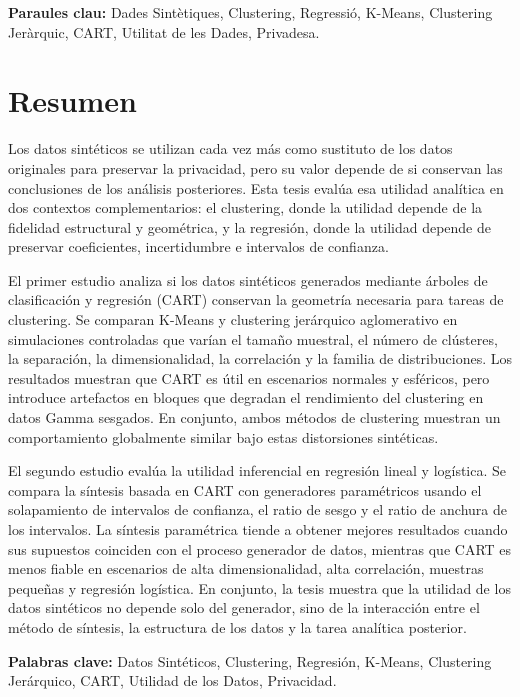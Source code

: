 \documentclass[12pt, a4paper, twoside]{report}
\begin{document}
\vspace{0.5cm}
\noindent\textbf{Paraules clau:} Dades Sint\`etiques, Clustering, Regressi\'o, K-Means, Clustering Jer\`arquic, CART, Utilitat de les Dades, Privadesa.

\newpage

\chapter*{Resumen}
Los datos sint\'eticos se utilizan cada vez m\'as como sustituto de los datos originales para preservar la privacidad, pero su valor depende de si conservan las conclusiones de los an\'alisis posteriores. Esta tesis eval\'ua esa utilidad anal\'itica en dos contextos complementarios: el clustering, donde la utilidad depende de la fidelidad estructural y geom\'etrica, y la regresi\'on, donde la utilidad depende de preservar coeficientes, incertidumbre e intervalos de confianza.

El primer estudio analiza si los datos sint\'eticos generados mediante \'arboles de clasificaci\'on y regresi\'on (CART) conservan la geometr\'ia necesaria para tareas de clustering. Se comparan K-Means y clustering jer\'arquico aglomerativo en simulaciones controladas que var\'ian el tama\~no muestral, el n\'umero de cl\'usteres, la separaci\'on, la dimensionalidad, la correlaci\'on y la familia de distribuciones. Los resultados muestran que CART es \'util en escenarios normales y esf\'ericos, pero introduce artefactos en bloques que degradan el rendimiento del clustering en datos Gamma sesgados. En conjunto, ambos m\'etodos de clustering muestran un comportamiento globalmente similar bajo estas distorsiones sint\'eticas.

El segundo estudio eval\'ua la utilidad inferencial en regresi\'on lineal y log\'istica. Se compara la s\'intesis basada en CART con generadores param\'etricos usando el solapamiento de intervalos de confianza, el ratio de sesgo y el ratio de anchura de los intervalos. La s\'intesis param\'etrica tiende a obtener mejores resultados cuando sus supuestos coinciden con el proceso generador de datos, mientras que CART es menos fiable en escenarios de alta dimensionalidad, alta correlaci\'on, muestras peque\~nas y regresi\'on log\'istica. En conjunto, la tesis muestra que la utilidad de los datos sint\'eticos no depende solo del generador, sino de la interacci\'on entre el m\'etodo de s\'intesis, la estructura de los datos y la tarea anal\'itica posterior.

\vspace{0.5cm}
\noindent\textbf{Palabras clave:} Datos Sint\'eticos, Clustering, Regresi\'on, K-Means, Clustering Jer\'arquico, CART, Utilidad de los Datos, Privacidad.
\end{document}
